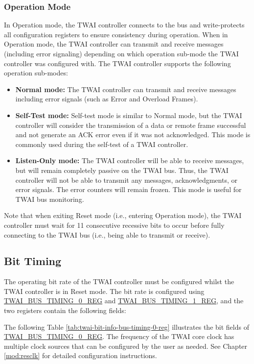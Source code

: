 \documentclass[main\_\_EN.tex]{subfiles}
\begin{document}
\subsubsection{Operation Mode}
In Operation mode, the TWAI controller connects to the bus and write-protects all configuration registers to ensure consistency during operation. When in Operation mode, the TWAI controller can transmit and receive messages (including error signaling) depending on which operation sub-mode the TWAI controller was configured with. The TWAI controller supports the following operation sub-modes:

\begin{itemize}
    \item {\bfseries Normal mode:} The TWAI controller can transmit and receive messages including error signals (such as Error and Overload Frames).
    \item {\bfseries Self-Test mode:} Self-test mode is similar to Normal mode, but the TWAI controller will consider the transmission of a data or remote frame successful and not generate an ACK error even if it was not acknowledged. This mode is commonly used during the self-test of a TWAI controller.
    \item {\bfseries Listen-Only mode:} The TWAI controller will be able to receive messages, but will remain completely passive on the TWAI bus. Thus, the TWAI controller will not be able to transmit any messages, acknowledgments, or error signals. The error counters will remain frozen. This mode is useful for TWAI bus monitoring.
\end{itemize}

Note that when exiting Reset mode (i.e., entering Operation mode), the TWAI controller must wait for 11 consecutive recessive bits to occur before fully connecting to the TWAI bus (i.e., being able to transmit or receive).

\subsection{Bit Timing}
The operating bit rate of the TWAI controller must be configured whilst the TWAI controller is in Reset mode. The bit rate is configured using \hyperref[regdesc:TWAIBUSTIMING0REG]{TWAI\_BUS\_TIMING\_0\_REG} and \hyperref[regdesc:TWAIBUSTIMING1REG]{TWAI\_BUS\_TIMING\_1\_REG}, and the two registers contain the following fields:

The following Table \ref{tab:twai-bit-info-bus-timing-0-reg} illustrates the bit fields of \hyperref[regdesc:TWAIBUSTIMING0REG]{TWAI\_BUS\_TIMING\_0\_REG}. The frequency of the TWAI core clock has multiple clock sources that can be configured by the user as needed. See Chapter \ref{mod:resclk} \textit{} for detailed configuration instructions.
\end{document}
